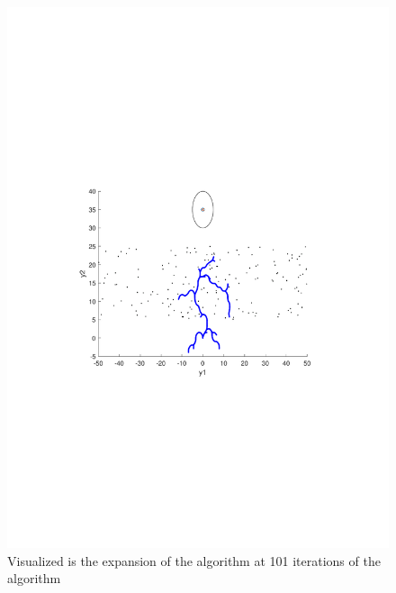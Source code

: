 \begin{figure}[!t]
\begin{minipage}[c]{.8\columnwidth}
    \includegraphics[width=1\columnwidth, trim={0cm, 10cm, 0cm, 9cm}, clip]{figures/experiments/rrtfunnel-101samples-dyn.pdf}
  \caption[The expansion of the \rrtfunnel algorithm at 1, and 101 iterations]{Visualized is the expansion of the \rrtfunnel algorithm at 101 iterations of the algorithm}
  \end{minipage}
  \newline
  \begin{minipage}[c]{.8\columnwidth}

\end{minipage}
\end{figure}
